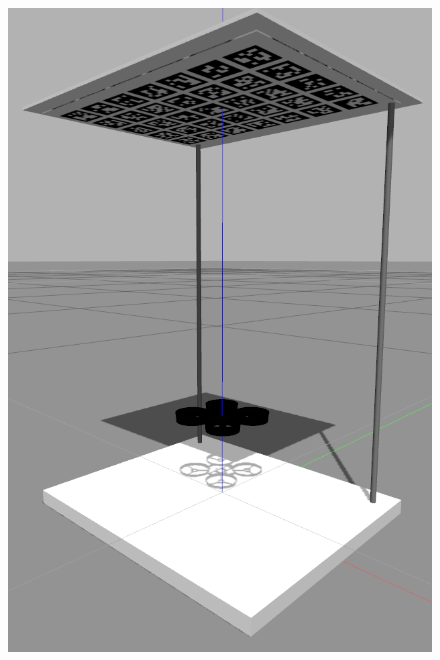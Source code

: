 \documentclass[12pt]{article}
\begin{document}
\begin{figure}[H]
	\centering
	\includegraphics[scale=0.25]{sim_pic}
	\endminipage\hfill

\end{figure}
\end{document}
